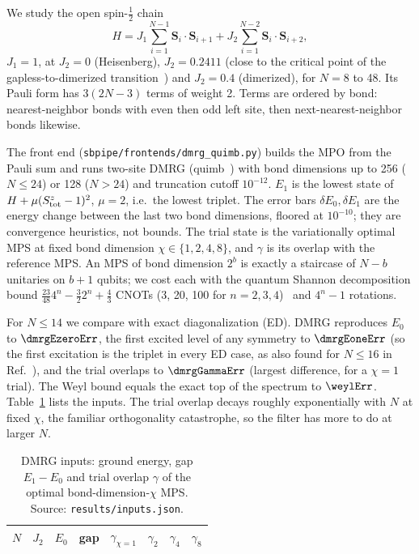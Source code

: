 \documentclass[aps,pra,twocolumn,superscriptaddress,nofootinbib]{revtex4-2}
\begin{document}
We study the open spin-$\frac12$ chain
\begin{equation}
H=J_1\sum_{i=1}^{N-1}\mathbf S_i\cdot\mathbf S_{i+1}+J_2\sum_{i=1}^{N-2}\mathbf S_i\cdot\mathbf S_{i+2},
\end{equation}
$J_1=1$, at $J_2=0$ (Heisenberg), $J_2=0.2411$ (close to the critical point of the
gapless-to-dimerized transition~\cite{Okamoto1992,Eggert1996}) and $J_2=0.4$ (dimerized), for $N=8$ to
48. Its Pauli form has $3(2N-3)$ terms of weight 2. Terms are ordered by bond: nearest-neighbor bonds
with even then odd left site, then next-nearest-neighbor bonds likewise.

The front end (\texttt{sbpipe/frontends/dmrg\_quimb.py}) builds the MPO from the Pauli sum and runs
two-site DMRG (quimb~\cite{Gray2018}) with bond dimensions up to 256 ($N\le24$) or 128 ($N>24$) and
truncation cutoff $10^{-12}$. $E_1$ is the lowest state of $H+\mu(S^z_{\rm tot}-1)^2$, $\mu=2$, i.e.\
the lowest triplet. The error bars $\delta E_0,\delta E_1$ are the energy change between the last two
bond dimensions, floored at $10^{-10}$; they are convergence heuristics, not bounds. The trial state is
the variationally optimal MPS at fixed bond dimension $\chi\in\{1,2,4,8\}$, and $\gamma$ is its
overlap with the reference MPS. An MPS of bond dimension $2^b$ is exactly a staircase of $N-b$ unitaries
on $b+1$ qubits; we cost each with the quantum Shannon decomposition bound
$\frac{23}{48}4^n-\frac32 2^n+\frac43$ CNOTs (3, 20, 100 for $n=2,3,4$)~\cite{Shende2006} and $4^n-1$
rotations.

For $N\le14$ we compare with exact diagonalization (ED). DMRG reproduces $E_0$ to $\dmrgEzeroErr$,
the first excited level of any symmetry to $\dmrgEoneErr$ (so the first excitation is the triplet in
every ED case, as also found for $N\le16$ in Ref.~\cite{repoWriteup}), and the trial overlaps to
$\dmrgGammaErr$ (largest difference, for a $\chi=1$ trial). The Weyl bound equals the exact top of the spectrum to $\weylErr$.
Table~\ref{tab:inputs} lists the inputs. The trial overlap decays roughly exponentially with $N$ at
fixed $\chi$, the familiar orthogonality catastrophe, so the filter has more to do at larger $N$.

\begin{table}[t]
\caption{DMRG inputs: ground energy, gap $E_1-E_0$ and trial overlap $\gamma$ of the optimal
bond-dimension-$\chi$ MPS. Source: \texttt{results/inputs.json}.}
\label{tab:inputs}
\begin{ruledtabular}
\begin{tabular}{rrrrrrrr}
$N$ & $J_2$ & $E_0$ & gap & $\gamma_{\chi=1}$ & $\gamma_{2}$ & $\gamma_4$ & $\gamma_8$\\
\midrule

\end{tabular}
\end{ruledtabular}
\end{table}
\end{document}
